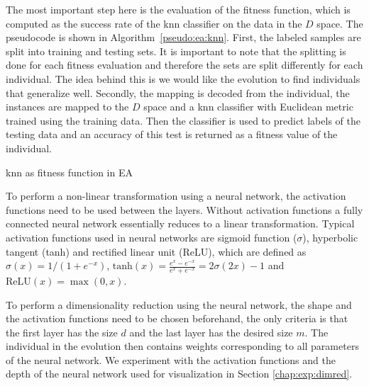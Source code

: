 \documentclass[12pt,a4paper]{report}
\begin{document}
The most important step here is the evaluation of the fitness function, which is computed as the success rate of the \ac{knn} classifier on the data in the $D$ space. The pseudocode is shown in Algorithm~\ref{pseudo:ea:knn}. First, the labeled samples are split into training and testing sets. It is important to note that the splitting is done for each fitness evaluation and therefore the sets are split differently for each individual. The idea behind this is we would like the evolution to find individuals that generalize well. Secondly, the mapping is decoded from the individual, the instances are mapped to the $D$ space and a \ac{knn} classifier with Euclidean metric trained using the training data. Then the classifier is used to predict labels of the testing data and an accuracy of this test is returned as a fitness value of the individual.

\begin{algorithm}[t]
\caption{\ac{knn} as fitness function in EA} \label{pseudo:ea:knn}
\DontPrintSemicolon
\LinesNumbered
{}
\end{algorithm} 

To perform a non-linear transformation using a neural network, the activation functions need to be used between the layers. Without activation functions a fully connected neural network essentially reduces to a linear transformation. Typical activation functions used in neural networks are sigmoid function ($\sigma$), hyperbolic tangent (tanh) and rectified linear unit (ReLU), which are defined as $\sigma(x) = 1/(1+e^{-x})$, $\text{tanh}(x) = \frac{e^x-e^{-x}}{e^x+e^{-x}} = 2\sigma(2x)-1$ and $\text{ReLU}(x) = \max(0,x)$.

To perform a dimensionality reduction using the neural network, the shape and the activation functions need to be chosen beforehand, the only criteria is that the first layer has the size $d$ and the last layer has the desired size $m$. The individual in the evolution then contains weights corresponding to all parameters of the neural network. We experiment with the activation functions and the depth of the neural network used for visualization in Section \ref{chap:exp:dimred}.
\end{document}
